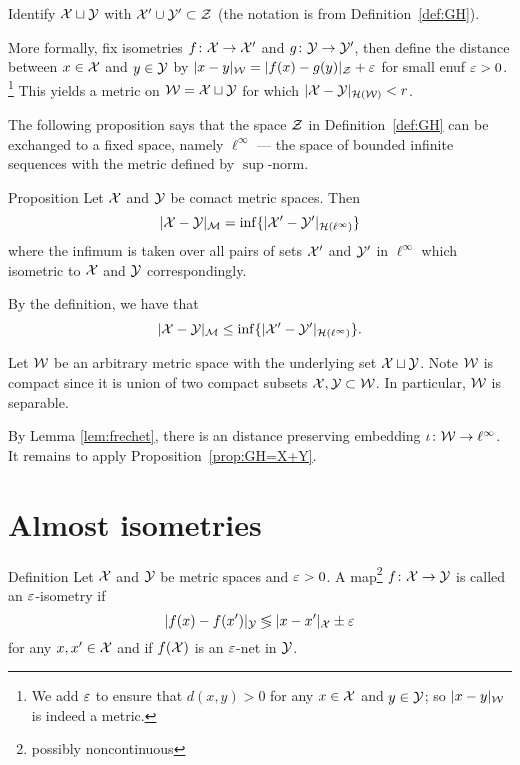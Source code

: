 Identify $\mathcal{X}\sqcup \mathcal{Y}$ with $\mathcal{X}'\cup \mathcal{Y}' \subset \mathcal{Z}$ 
(the notation
is from Definition~\ref{def:GH}). 

More formally, fix isometries $f\colon \mathcal{X} \to \mathcal{X}'$ and
$g\colon \mathcal{Y} \to \mathcal{Y}'$, then define the distance between $x \in \mathcal{X}$ and $y \in \mathcal{Y}$ by
$|x-y|_{\mathcal{W}} = |f (x)- g(y)|_{\mathcal{Z}}+\varepsilon$ for small enuf $\varepsilon>0$.%
\footnote{We add $\varepsilon$ to ensure that $d(x, y) > 0$ for any $x\in \mathcal{X}$ and $y\in \mathcal{Y}$;
so $|x-y|_{\mathcal{W}}$ is indeed a metric.}
This yields a metric on $\mathcal{W}=\mathcal{X}\sqcup \mathcal{Y}$ for which
$|\spc{X}- \spc{Y}|_{\mathcal{H}(\spc{W})} \z< r$.
\qeds

The following proposition says that the space $\mathcal{Z}$ in Definition~\ref{def:GH} can be exchanged to a fixed space, namely $\ell^\infty$ --- the space of bounded infinite sequences with the metric defined by $\sup$-norm.

\begin{thm}{Proposition}\label{prop:GH-with-fixed-Z}
Let $\mathcal{X}$ and $\mathcal{Y}$ be comact metric spaces.
Then
$$|\mathcal{X}-\mathcal{Y}|_{\mathcal{M}} = \inf \{|\mathcal{X}'-\mathcal{Y}'|_{\mathcal{H}(\ell^\infty)}\}$$ 
where the infimum is taken over all pairs of sets $\mathcal{X}'$ and $\mathcal{Y}'$ in $\ell^\infty$
which isometric to  $\mathcal{X}$ and $\mathcal{Y}$ correspondingly.  
\end{thm}




By the definition, we have that 
\[|\mathcal{X}-\mathcal{Y}|_{\mathcal{M}} \leq \inf \{|\mathcal{X}'-\mathcal{Y}'|_{\mathcal{H}(\ell^\infty)}\}.\]

Let $\mathcal{W}$ be an arbitrary metric space with the underlying set $\mathcal{X}\sqcup \mathcal{Y}$.
Note $\mathcal{W}$ is compact since it is union of two compact subsets $\mathcal{X},\mathcal{Y}\subset \mathcal{W}$.
In particular, $\mathcal{W}$ is separable.

By Lemma \ref{lem:frechet}, there is an distance preserving embedding $\iota\:\spc{W}\z\to \ell^\infty$.
It remains to apply Proposition~\ref{prop:GH=X+Y}.
\qeds



\section{Almost isometries}\label{sec:alm-isom}

\begin{thm}{Definition} Let $\mathcal{X}$ and $\mathcal{Y}$ be metric spaces and $\varepsilon > 0$. 
A  map\footnote{possibly noncontinuous} $f\: \spc{X} \z\to \spc{Y}$ is called an $\varepsilon$-isometry 
if 
$$|f(x)-f(x')|_{\mathcal{Y}}\lessgtr |x-x'|_{\mathcal{X}}\pm\varepsilon$$
for any $x,x'\in \mathcal{X}$ 
and if $f(\mathcal{X})$ is an $\varepsilon$-net in $\mathcal{Y}$.
\end{thm}

